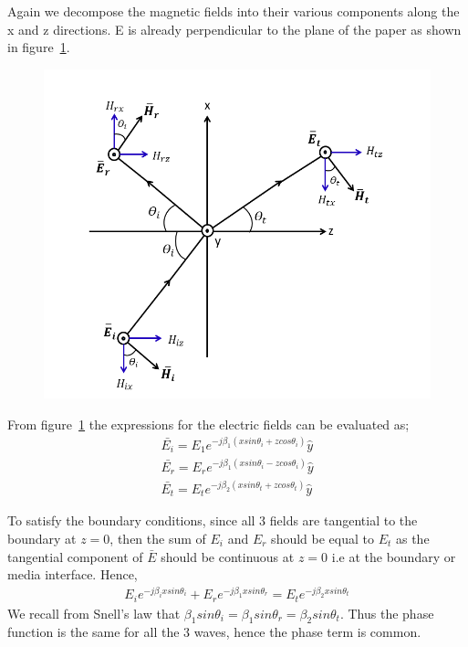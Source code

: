 Again we decompose the magnetic fields into their various components along the x and z directions. E is already perpendicular to the plane of the paper as shown in figure~\ref{fig:14}.
\begin{figure}[h]
\centering
\includegraphics[width=1.2\linewidth]{graphics/perpendicular_polarization3}
\caption{}
\label{fig:14}
\end{figure}

From figure~\ref{fig:14} the expressions for the electric fields can be evaluated as;
\begin{align*}
\bar{E_{i}} = E_{1} e^{-j\beta_{1} (x sin\theta_{i} + z cos\theta_{i})} \hat{y}\\
\bar{E_{r}} = E_{r} e^{-j\beta_{1} (x sin\theta_{i} - z cos\theta_{i})} \hat{y}\\
\bar{E_{t}} = E_{t} e^{-j\beta_{2} (x sin\theta_{t} + z cos\theta_{t})} \hat{y}
\end{align*}

To satisfy the boundary conditions, since all 3 fields are tangential to the boundary at $z=0$, then the sum of $E_i$ and $E_r$ should be equal to $E_{t}$ as the tangential component of $\bar{E}$ should be continuous at $z=0$ i.e at the boundary or media interface.
Hence,
\begin{align*}
E_{i} e^{-j \beta_{i} x sin\theta_{i}} + E_{r} e^{-j \beta_{1} x sin\theta_{r}} = E_{t} e^{-j \beta_{2} x sin\theta_{t}}
\end{align*}
We recall from Snell's law that $\beta_{1} sin\theta_{i} = \beta_{1} sin\theta_{r} = \beta_{2} sin\theta_{t}$. Thus the phase function is the same for all the 3 waves, hence the phase term is common.

